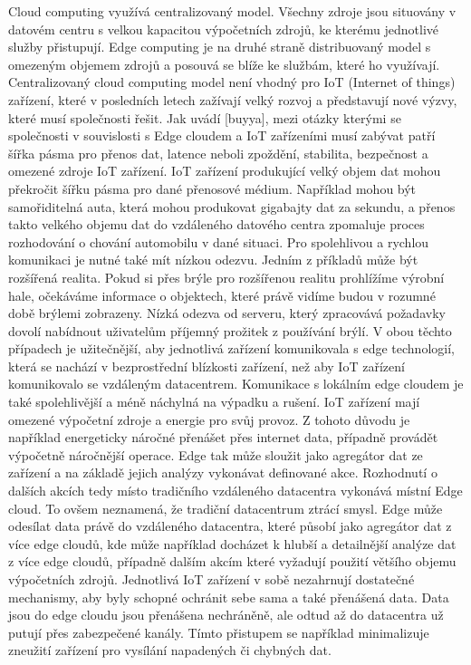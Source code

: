  Cloud computing využívá centralizovaný model. Všechny zdroje jsou situovány v datovém centru s velkou kapacitou výpočetních zdrojů, ke kterému jednotlivé služby přistupují. Edge computing je na druhé straně distribuovaný model s omezeným objemem zdrojů a posouvá se blíže ke službám, které ho využívají. Centralizovaný cloud computing model není vhodný pro IoT (Internet of things) zařízení, které v posledních letech zažívají velký rozvoj a představují nové výzvy, které musí společnosti řešit. Jak uvádí [buyya], mezi otázky kterými se společnosti v souvislosti s Edge cloudem a IoT zařízeními musí zabývat patří šířka pásma pro přenos dat, latence neboli zpoždění, stabilita, bezpečnost a omezené zdroje IoT zařízení. IoT zařízení produkující velký objem dat mohou překročit šířku pásma pro dané přenosové médium. Například mohou být samořiditelná auta, která mohou produkovat gigabajty dat za sekundu, a přenos takto velkého objemu dat do vzdáleného datového centra zpomaluje proces rozhodování o chování automobilu v dané situaci. Pro spolehlivou a rychlou komunikaci je nutné také mít nízkou odezvu. Jedním z příkladů může být rozšířená realita. Pokud si přes brýle pro rozšířenou realitu prohlížíme výrobní hale, očekáváme informace o objektech, které právě vidíme budou v rozumné době brýlemi zobrazeny. Nízká odezva od serveru, který zpracovává požadavky dovolí nabídnout uživatelům příjemný prožitek z používání brýlí. V obou těchto případech je užitečnější, aby jednotlivá zařízení komunikovala s edge technologií, která se nachází v bezprostřední blízkosti zařízení, než aby IoT zařízení komunikovalo se vzdáleným datacentrem. Komunikace s lokálním edge cloudem je také spolehlivější a méně náchylná na výpadku a rušení. IoT zařízení mají omezené výpočetní zdroje a energie pro svůj provoz. Z tohoto důvodu je například energeticky náročné přenášet přes internet data, případně provádět výpočetně náročnější operace. Edge tak může sloužit jako agregátor dat ze zařízení a na základě jejich analýzy vykonávat definované akce. Rozhodnutí o dalších akcích tedy místo tradičního vzdáleného datacentra vykonává místní Edge cloud. To ovšem neznamená, že tradiční datacentrum ztrácí smysl. Edge může odesílat data právě do vzdáleného datacentra, které působí jako agregátor dat z více edge cloudů, kde může například docházet k hlubší a detailnější analýze dat z více edge cloudů, případně dalším akcím které vyžadují použití většího objemu výpočetních zdrojů. Jednotlivá IoT zařízení v sobě nezahrnují dostatečné mechanismy, aby byly schopné ochránit sebe sama a také přenášená data. Data jsou do edge cloudu jsou přenášena nechráněně, ale odtud až do datacentra už putují přes zabezpečené kanály. Tímto přistupem se například minimalizuje zneužití zařízení pro vysílání napadených či chybných dat.\par
